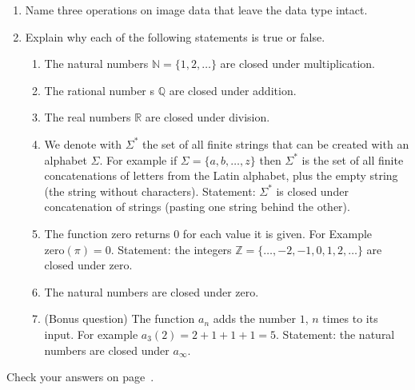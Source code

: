 \begin{enumerate}
\begin{enumerate}
  \end{enumerate}
\item Name three operations on image data that leave the data type intact.
\item Explain why each of the following statements is true or false.
\begin{enumerate}
  \item The natural numbers $\mathbb{N}=\{1,2,\ldots\}$ are closed under multiplication.
  \item The rational number s $\mathbb{Q}$ are closed under addition.
  \item The real numbers $\mathbb{R}$ are closed under division.
  \item We denote with $\Sigma^*$ the set of all finite strings that can be
    created with an alphabet $\Sigma$. For example if $\Sigma=\{a,b,\ldots,z\}$
    then $\Sigma^*$ is the set of all finite concatenations of letters from the
    Latin alphabet, plus the empty string (the string without characters).
    Statement: $\Sigma^*$ is closed under concatenation of strings (pasting one
    string behind the other).
 \item The function $\textrm{zero}$ returns $0$ for each value it is given. For
       Example $\textrm{zero}(\pi)=0$. Statement: the integers $\mathbb{Z}=\{\ldots, -2, -1, 0, 1, 2,\ldots\}$ are closed under $\textrm{zero}$.
 \item The natural numbers are closed under $\textrm{zero}$.
 \item (Bonus question) The function $a_n$ adds the number $1$, $n$ times to
    its input.  For example $a_3(2)=2+1+1+1=5$. Statement: the natural numbers are
    closed under $a_\infty$.
\end{enumerate}
\end{enumerate}

\hfill{}Check your answers on page~\pageref{sect:ansfaces}.


